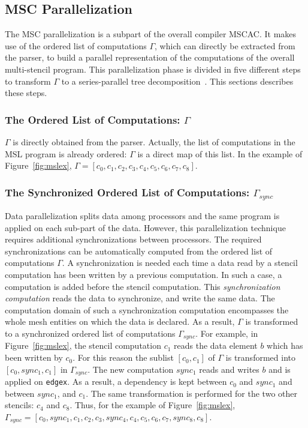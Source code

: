 \subsection{MSC Parallelization}
\label{sect:msc}
The MSC parallelization is a subpart of the overall compiler MSCAC.
It makes use of the ordered list of computations $\Gamma$, which can directly be extracted from the parser, to build a parallel representation of the computations of the overall multi-stencil program.
This parallelization phase is divided in five different steps to transform $\Gamma$ to a series-parallel tree decomposition~\cite{Valdes:1979:RSP:800135.804393}. This sections describes these steps.

\subsubsection*{The Ordered List of Computations: $\Gamma$}
$\Gamma$ is directly obtained from the parser. Actually, the list of computations in the MSL program is already ordered: $\Gamma$ is a direct map of this list. In the example of Figure~\ref{fig:mslex}, $\Gamma = [c_0,c_1,c_2,c_3,c_4,c_5,c_6,c_7,c_8]$.

\subsubsection*{The Synchronized Ordered List of Computations: $\Gamma_{sync}$}
Data parallelization splits data among processors and the same program is applied on each sub-part of the data.
However, this parallelization technique requires additional synchronizations between processors.
The required synchronizations can be automatically computed from the ordered list of computations $\Gamma$.
A synchronization is needed each time a data read by a stencil computation has been written by a previous computation. In such a case, a computation is added before the stencil computation. This \emph{synchronization computation} reads the data to synchronize, and write the same data. The computation domain of such a synchronization computation encompasses the whole mesh entities on which the data is declared. As a result, $\Gamma$ is transformed to a synchronized ordered list of computations $\Gamma_{sync}$.
For example, in Figure~\ref{fig:mslex}, the stencil computation $c_1$ reads the data element $b$ which has been written by $c_0$. For this reason the sublist $[c_0,c_1]$ of $\Gamma$ is transformed into $[c_0,sync_1,c_1]$ in $\Gamma_{sync}$. The new computation $sync_1$ reads and writes $b$ and is applied on \texttt{edgex}. As a result, a dependency is kept between $c_0$ and $sync_1$ and between $sync_1$, and $c_1$. The same transformation is performed for the two other stencils: $c_4$ and $c_8$. Thus, for the example of Figure~\ref{fig:mslex}, $\Gamma_{sync} = [c_0,sync_1,c_1,c_2,c_3,sync_4,c_4,c_5,c_6,c_7,sync_8,c_8]$.

